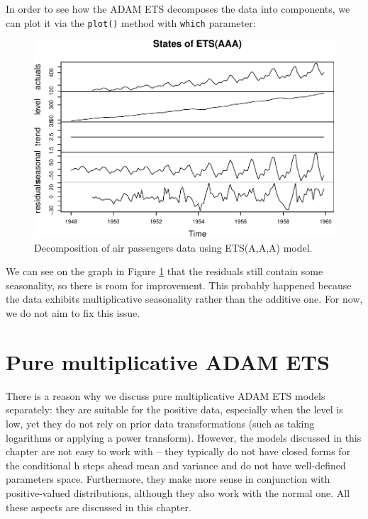 \documentclass[
]{book}
\theoremstyle{definition}
\theoremstyle{definition}
\theoremstyle{definition}
\theoremstyle{definition}
\theoremstyle{remark}
\begin{document}
In order to see how the ADAM ETS decomposes the data into components, we can plot it via the \texttt{plot()} method with \texttt{which} parameter:

\begin{figure}
\centering
\includegraphics{Svetunkov--2022----ADAM_files/figure-latex/AirPassengersAAADecomposition-1.pdf}
\caption{\label{fig:AirPassengersAAADecomposition}Decomposition of air passengers data using ETS(A,A,A) model.}
\end{figure}

We can see on the graph in Figure \ref{fig:AirPassengersAAADecomposition} that the residuals still contain some seasonality, so there is room for improvement. This probably happened because the data exhibits multiplicative seasonality rather than the additive one. For now, we do not aim to fix this issue.

\hypertarget{ADAMETSPureMultiplicativeChapter}{%
\chapter{Pure multiplicative ADAM ETS}\label{ADAMETSPureMultiplicativeChapter}}

There is a reason why we discuss pure multiplicative ADAM ETS models separately: they are suitable for the positive data, especially when the level is low, yet they do not rely on prior data transformations (such as taking logarithms or applying a power transform). However, the models discussed in this chapter are not easy to work with -- they typically do not have closed forms for the conditional h steps ahead mean and variance and do not have well-defined parameters space. Furthermore, they make more sense in conjunction with positive-valued distributions, although they also work with the normal one. All these aspects are discussed in this chapter.
\end{document}
